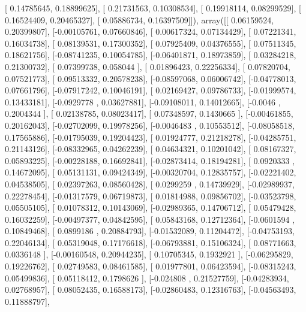 \documentclass{article}
\begin{document}
       [ 0.14785645,  0.18899625],
       [ 0.21731563,  0.10308534],
       [ 0.19918114,  0.08299529],
       [ 0.16524409,  0.20465327],
       [ 0.05886734,  0.16397509]]), array([[ 0.06159524,  0.20399807],
       [-0.00105761,  0.07660846],
       [ 0.00617324,  0.07134429],
       [ 0.07221341,  0.16034738],
       [ 0.08139531,  0.17300352],
       [ 0.07925409,  0.04376555],
       [ 0.07511345,  0.18621756],
       [-0.08741235,  0.10054785],
       [-0.06401871,  0.18973859],
       [ 0.03284218,  0.21300732],
       [ 0.07399738,  0.058044  ],
       [ 0.01896423,  0.22256334],
       [ 0.07820704,  0.07521773],
       [ 0.09513332,  0.20578238],
       [-0.08597068,  0.06006742],
       [-0.04778013,  0.07661796],
       [-0.07917242,  0.10046191],
       [ 0.02169427,  0.09786733],
       [-0.01999574,  0.13433181],
       [-0.0929778 ,  0.03627881],
       [-0.09108011,  0.14012665],
       [-0.0046    ,  0.2004344 ],
       [ 0.02138785,  0.08023417],
       [ 0.07348597,  0.1430665 ],
       [-0.00461855,  0.20162043],
       [-0.02702099,  0.19978256],
       [-0.0046483 ,  0.10553512],
       [-0.08058518,  0.17565886],
       [-0.01795039,  0.19204423],
       [ 0.01924777,  0.21218278],
       [-0.04285751,  0.21143126],
       [-0.08332965,  0.04262239],
       [ 0.04634321,  0.10201042],
       [ 0.08167327,  0.05893225],
       [-0.00228188,  0.16692841],
       [-0.02873414,  0.18194281],
       [ 0.0920333 ,  0.14672095],
       [ 0.05131131,  0.09424349],
       [-0.00320704,  0.12835757],
       [-0.02221402,  0.04538505],
       [ 0.02397263,  0.08560428],
       [ 0.0299259 ,  0.14739929],
       [-0.02989937,  0.22278454],
       [-0.01317579,  0.06719873],
       [ 0.01814988,  0.09856702],
       [-0.03523798,  0.05505105],
       [ 0.01078312,  0.10143069],
       [-0.02989365,  0.14706712],
       [ 0.05479428,  0.16032259],
       [-0.00497377,  0.04842595],
       [ 0.05843168,  0.12712364],
       [-0.0601594 ,  0.10849468],
       [ 0.0899186 ,  0.20884793],
       [-0.01532089,  0.11204472],
       [-0.04753193,  0.22046134],
       [ 0.05319048,  0.17176618],
       [-0.06793881,  0.15106324],
       [ 0.08771663,  0.0336148 ],
       [-0.00160548,  0.20944235],
       [ 0.10705345,  0.1932921 ],
       [-0.06295829,  0.19226762],
       [ 0.02749583,  0.08461585],
       [ 0.01977801,  0.06423594],
       [-0.08315243,  0.05499836],
       [ 0.05118412,  0.1798626 ],
       [-0.024808  ,  0.21527759],
       [-0.04283934,  0.02768957],
       [ 0.08052435,  0.16588173],
       [-0.02860483,  0.12316763],
       [-0.04563493,  0.11888797],
\end{document}
